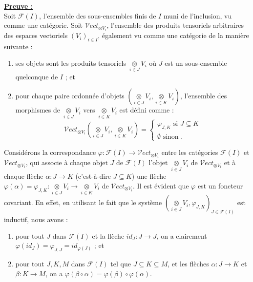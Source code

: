 \documentclass[a4paper, 14pt]{report}
\begin{document}
\begin{onehalfspace}
{			\textbf{\underline{Preuve :}}\\
			Soit $\mathcal{F}(I)$, l'ensemble des sous-ensembles finis de $I$ muni de l'inclusion, vu comme une catégorie. Soit $\mathcal{V}ect_{\otimes V_i}$, l'ensemble des produits tensoriels arbitraires des espaces vectoriels $(V_i)_{i\in I}$, également vu comme une catégorie de la manière suivante : 
			\begin{enumerate}
				\item ses objets sont les produits tensoriels $\underset{i\in J}\otimes V_i$ où $J$ est un sous-ensemble quelconque de $I$ ; et
				\item pour chaque paire ordonnée d'objets $(\underset{i\in J}\otimes V_i, \underset{i\in K}\otimes V_i)$, l'ensemble des morphismes de $\underset{i\in J}\otimes V_i$ vers $\underset{i\in K}\otimes V_i$ est défini comme : 
				$$\mathcal{V}ect_{\otimes V_i} (\underset{i\in J}\otimes V_i, \underset{i\in K}\otimes V_i)= \left\{\begin{array}{ccc}
					\varphi_{J,K}  \text{ si } J\subseteq K\\
					\emptyset  \text{ sinon }. 
				\end{array}
				\right.$$
			\end{enumerate} 
			Considérons la correspondance $\varphi: \mathcal{F}(I)\rightarrow \mathcal{V}ect_{\otimes V_i}$ entre les catégories $\mathcal{F}(I)$ et $\mathcal{V}ect_{\otimes V_i}$, qui associe à chaque objet $J$ de $\mathcal{F}(I)$ l'objet $\underset{i\in J}\otimes V_i$ de $\mathcal{V}ect_{\otimes V_i}$ et à chaque flèche $\alpha: J\rightarrow K$ (c'est-à-dire $J\subseteq K$) une flèche $\varphi(\alpha)= \varphi_{J,K}: \underset{i\in J}\otimes V_i\rightarrow \underset{i\in K}\otimes V_i$ de $\mathcal{V}ect_{\otimes V_i}$. Il est évident que $\varphi$ est un foncteur covariant. En effet, en utilisant le fait que le système $(\underset{i\in J}\otimes V_i, \varphi_{J,K})_{J\in \mathcal{F}(I)}$ est inductif, nous avons :
			\begin{enumerate}
				\item pour tout $J$ dans $\mathcal{F}(I)$ et la flèche $id_{J}: J\rightarrow J$, on a clairement  $\varphi(id_{J})= \varphi_{J, J}= id_{\varphi(J)}$ ;  et
				\item pour tout $J, K, M$ dans $\mathcal{F}(I)$ tel que $J\subseteq K\subseteq M$, et les flèches $\alpha: J\rightarrow K$ et $\beta: K\rightarrow M$, on a $\varphi(\beta\circ \alpha)= \varphi(\beta)\circ \varphi(\alpha)$.
			\end{enumerate}
}
\end{onehalfspace}
\end{document}
